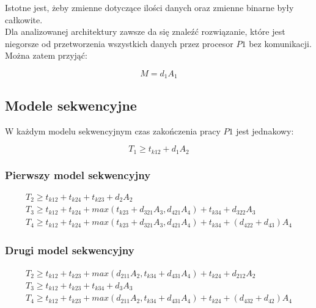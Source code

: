 Istotne jest, żeby zmienne dotyczące ilości danych oraz zmienne binarne były całkowite. \\

Dla analizowanej architektury zawsze da się znaleźć rozwiązanie, które jest niegorsze od
przetworzenia wszystkich danych przez procesor $P1$ bez komunikacji. Można zatem przyjąć:

\begin{equation} \label{eq:M}
M = d_{1}A_{1}
\end{equation}

\subsection{Modele sekwencyjne}

W każdym modelu sekwencyjnym czas zakończenia pracy $P1$ jest jednakowy:

\begin{equation} \label{eq:sekT1}
T_{1} \geq t_{k12} + d_{1}A_{2}
\end{equation}

\subsubsection{Pierwszy model sekwencyjny}

\begin{equation} \label{eq:sek1}
\begin{array}{l}
T_{2} \geq t_{k12} + t_{k24} + t_{k23} + d_{2}A_{2} \\
T_{3} \geq t_{k12} + t_{k24} + max(t_{k23} + d_{321}A_{3}, d_{421}A_{4}) + t_{k34} + d_{322}A_{3} \\
T_{4} \geq t_{k12} + t_{k24} + max(t_{k23} + d_{321}A_{3}, d_{421}A_{4}) + t_{k34} + (d_{422} + d_{43})A_{4}
\end{array} 
\end{equation}

\subsubsection{Drugi model sekwencyjny}

\begin{equation} \label{eq:sek2}
\begin{array}{l}
T_{2} \geq t_{k12} + t_{k23} + max(d_{211}A_{2}, t_{k34} + d_{431}A_{4}) + t_{k24} + d_{212}A_{2} \\
T_{3} \geq t_{k12} + t_{k23} + t_{k34} + d_{3}A_{3} \\
T_{4} \geq t_{k12} + t_{k23} + max(d_{211}A_{2}, t_{k34} + d_{431}A_{4}) + t_{k24} + (d_{432} + d_{42})A_{4}
\end{array} 
\end{equation}

